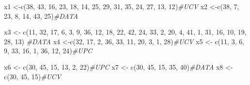 \documentclass[
]{article}
\newenvironment{Shaded}{\begin{snugshade}}{\end{snugshade}}
\newcommand{\CommentTok}[1]{\textcolor[rgb]{0.56,0.35,0.01}{\textit{#1}}}
\newcommand{\DecValTok}[1]{\textcolor[rgb]{0.00,0.00,0.81}{#1}}
\newcommand{\FunctionTok}[1]{\textcolor[rgb]{0.00,0.00,0.00}{#1}}
\newcommand{\NormalTok}[1]{#1}
\newcommand{\OtherTok}[1]{\textcolor[rgb]{0.56,0.35,0.01}{#1}}
\begin{document}
\begin{Shaded}
\begin{Highlighting}[]
\NormalTok{x1 }\OtherTok{\textless{}{-}}\FunctionTok{c}\NormalTok{(}\DecValTok{38}\NormalTok{, }\DecValTok{43}\NormalTok{, }\DecValTok{16}\NormalTok{, }\DecValTok{23}\NormalTok{, }\DecValTok{18}\NormalTok{, }\DecValTok{14}\NormalTok{, }\DecValTok{25}\NormalTok{, }\DecValTok{29}\NormalTok{, }\DecValTok{31}\NormalTok{, }\DecValTok{35}\NormalTok{, }\DecValTok{24}\NormalTok{, }\DecValTok{27}\NormalTok{, }\DecValTok{13}\NormalTok{, }\DecValTok{12}\NormalTok{)}\CommentTok{\#UCV}
\NormalTok{x2 }\OtherTok{\textless{}{-}}\FunctionTok{c}\NormalTok{(}\DecValTok{38}\NormalTok{, }\DecValTok{7}\NormalTok{, }\DecValTok{23}\NormalTok{, }\DecValTok{8}\NormalTok{, }\DecValTok{14}\NormalTok{, }\DecValTok{43}\NormalTok{, }\DecValTok{25}\NormalTok{)}\CommentTok{\#DATA}

\NormalTok{x3 }\OtherTok{\textless{}{-}} \FunctionTok{c}\NormalTok{(}\DecValTok{11}\NormalTok{, }\DecValTok{32}\NormalTok{, }\DecValTok{17}\NormalTok{, }\DecValTok{6}\NormalTok{, }\DecValTok{3}\NormalTok{, }\DecValTok{9}\NormalTok{, }\DecValTok{36}\NormalTok{, }\DecValTok{12}\NormalTok{, }\DecValTok{18}\NormalTok{, }\DecValTok{22}\NormalTok{, }\DecValTok{42}\NormalTok{, }\DecValTok{24}\NormalTok{, }\DecValTok{33}\NormalTok{, }\DecValTok{2}\NormalTok{, }\DecValTok{20}\NormalTok{, }\DecValTok{4}\NormalTok{, }\DecValTok{41}\NormalTok{, }\DecValTok{1}\NormalTok{, }\DecValTok{31}\NormalTok{, }\DecValTok{16}\NormalTok{, }\DecValTok{10}\NormalTok{, }\DecValTok{19}\NormalTok{, }\DecValTok{28}\NormalTok{, }\DecValTok{13}\NormalTok{) }\CommentTok{\#DATA}
\NormalTok{x4 }\OtherTok{\textless{}{-}}\FunctionTok{c}\NormalTok{(}\DecValTok{32}\NormalTok{, }\DecValTok{17}\NormalTok{, }\DecValTok{2}\NormalTok{, }\DecValTok{36}\NormalTok{, }\DecValTok{33}\NormalTok{, }\DecValTok{11}\NormalTok{, }\DecValTok{20}\NormalTok{, }\DecValTok{3}\NormalTok{, }\DecValTok{1}\NormalTok{, }\DecValTok{28}\NormalTok{)}\CommentTok{\#UCV}
\NormalTok{x5 }\OtherTok{\textless{}{-}} \FunctionTok{c}\NormalTok{(}\DecValTok{11}\NormalTok{, }\DecValTok{3}\NormalTok{, }\DecValTok{6}\NormalTok{, }\DecValTok{9}\NormalTok{, }\DecValTok{33}\NormalTok{, }\DecValTok{16}\NormalTok{, }\DecValTok{1}\NormalTok{, }\DecValTok{36}\NormalTok{, }\DecValTok{12}\NormalTok{, }\DecValTok{24}\NormalTok{)}\CommentTok{\#UPC}

\NormalTok{x6 }\OtherTok{\textless{}{-}} \FunctionTok{c}\NormalTok{(}\DecValTok{30}\NormalTok{, }\DecValTok{45}\NormalTok{, }\DecValTok{15}\NormalTok{, }\DecValTok{13}\NormalTok{, }\DecValTok{2}\NormalTok{, }\DecValTok{22}\NormalTok{)}\CommentTok{\#UPC}
\NormalTok{x7 }\OtherTok{\textless{}{-}} \FunctionTok{c}\NormalTok{(}\DecValTok{30}\NormalTok{, }\DecValTok{45}\NormalTok{, }\DecValTok{15}\NormalTok{, }\DecValTok{35}\NormalTok{, }\DecValTok{40}\NormalTok{)}\CommentTok{\#DATA}
\NormalTok{x8 }\OtherTok{\textless{}{-}} \FunctionTok{c}\NormalTok{(}\DecValTok{30}\NormalTok{, }\DecValTok{45}\NormalTok{, }\DecValTok{15}\NormalTok{)}\CommentTok{\#UCV}


\end{Highlighting}
\end{Shaded}
\end{document}
